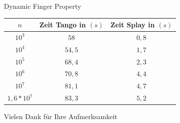 \documentclass[11pt]{beamer}
\begin{document}
\begin{frame} {Dynamic Finger Property}
\begin{table}[H]
	\begin{center}
		\begin{tabular}[c]{|c|c|c|}
			\hline
			$n$ & Zeit Tango in $\left(s\right)$ &Zeit Splay in $\left(s\right)$ \\
			\hline
			$10^3$ & $58$ &$0,8$ \\
			\hline
			$10^4$  & $54,5$ &$1,7$  \\
			\hline
			$10^5$  & $68,4$ &$2,3$  \\
			\hline
			$10^6$  & $70,8$ &$4,4$  \\
			\hline
			$10^7$  & $81,1$ &$4,7$  \\
			\hline
			$1,6 *10^7$  & $83,3$ &$5,2$  \\
			\hline
		\end{tabular} 
	\end{center}
\end{table}	
\end{frame}
\begin{frame}
	\begin{center}
			Vielen Dank für Ihre Aufmerksamkeit
	\end{center}

\end{frame}
\end{document}
